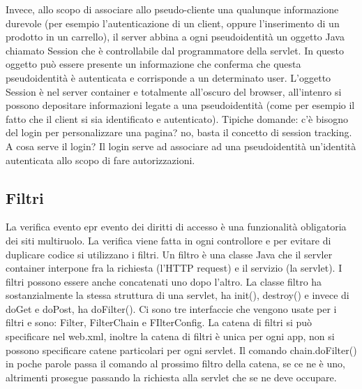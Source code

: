 Invece, allo scopo di associare allo pseudo-cliente una qualunque informazione durevole (per esempio l'autenticazione di un client, oppure l'inserimento di un prodotto in un carrello), il server abbina a ogni pseudoidentità un oggetto Java chiamato Session che è controllabile dal programmatore della servlet. In questo oggetto può essere presente un informazione che conferma che questa pseudoidentità è autenticata e corrisponde a un determinato user. L'oggetto Session è nel server container e totalmente all'oscuro del browser, all'intenro si possono depositare informazioni legate a una pseudoidentità (come per esempio il fatto che il client si sia identificato e autenticato).\newline
\newline
Tipiche domande: c'è bisogno del login per personalizzare una pagina? no, basta il concetto di session tracking. A cosa serve il login? Il login serve ad associare ad una pseudoidentità un'identità autenticata allo scopo di fare autorizzazioni.
\subsection{Filtri}
La verifica evento epr evento dei diritti di accesso è una funzionalità obligatoria dei siti multiruolo.\newline
\newline
La verifica viene fatta in ogni controllore e per evitare di duplicare codice si utilizzano i filtri.\newline
\newline
Un filtro è una classe Java che il servler container interpone fra la richiesta (l'HTTP request) e il servizio (la servlet). I filtri possono essere anche concatenati uno dopo l'altro.\newline
\newline
La classe filtro ha sostanzialmente la stessa struttura di una servlet, ha init(), destroy() e invece di doGet e doPost, ha doFilter(). Ci sono tre interfaccie che vengono usate per i filtri e sono: Filter, FilterChain e FIlterConfig.\newline
\newline
La catena di filtri si può specificare nel web.xml, inoltre la catena di filtri è unica per ogni app, non si possono specificare catene particolari per ogni servlet. Il comando chain.doFilter() in poche parole passa il comando al prossimo filtro della catena, se ce ne è uno, altrimenti prosegue passando la richiesta alla servlet che se ne deve occupare.\newline
\newline